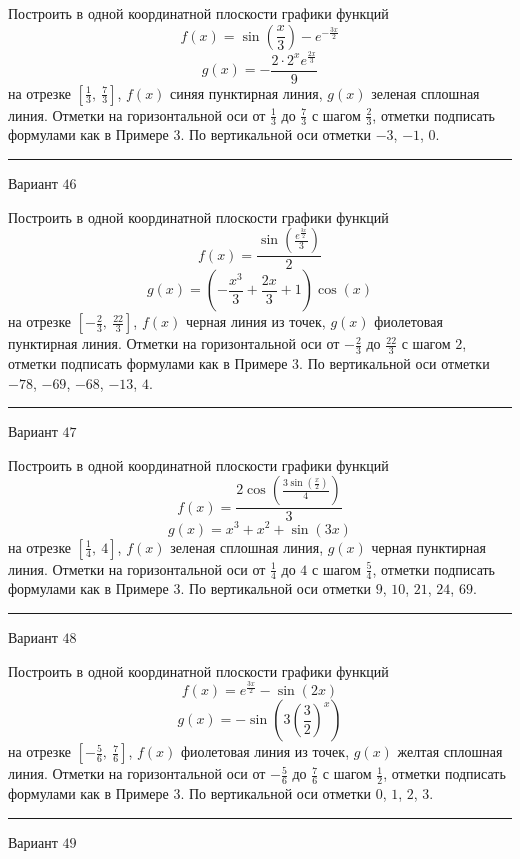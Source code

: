 \documentclass[11pt]{report}
\begin{document}
Построить в одной координатной плоскости графики функций $$f(x) = \sin{\left(\frac{x}{3} \right)} - e^{- \frac{3 x}{2}}$$ $$g(x) = - \frac{2 \cdot 2^{x} e^{\frac{2 x}{3}}}{9}$$ на отрезке $\left[\frac{1}{3}, \  \frac{7}{3}\right]$, $f(x)$ синяя пунктирная линия, $g(x)$ зеленая сплошная линия. Отметки на горизонтальной оси от $\frac{1}{3}$ до $\frac{7}{3}$ с шагом $\frac{2}{3}$, отметки подписать формулами как в Примере 3. По вертикальной оси отметки $-3$, $-1$, $0$.
\begin{center}
\noindent\rule{8cm}{0.4pt}
\end{center}
Вариант $46$


Построить в одной координатной плоскости графики функций $$f(x) = \frac{\sin{\left(\frac{e^{\frac{3 x}{2}}}{3} \right)}}{2}$$ $$g(x) = \left(- \frac{x^{3}}{3} + \frac{2 x}{3} + 1\right) \cos{\left(x \right)}$$ на отрезке $\left[- \frac{2}{3}, \  \frac{22}{3}\right]$, $f(x)$ черная линия из точек, $g(x)$ фиолетовая пунктирная линия. Отметки на горизонтальной оси от $- \frac{2}{3}$ до $\frac{22}{3}$ с шагом $2$, отметки подписать формулами как в Примере 3. По вертикальной оси отметки $-78$, $-69$, $-68$, $-13$, $4$.
\begin{center}
\noindent\rule{8cm}{0.4pt}
\end{center}
Вариант $47$


Построить в одной координатной плоскости графики функций $$f(x) = \frac{2 \cos{\left(\frac{3 \sin{\left(\frac{x}{2} \right)}}{4} \right)}}{3}$$ $$g(x) = x^{3} + x^{2} + \sin{\left(3 x \right)}$$ на отрезке $\left[\frac{1}{4}, \  4\right]$, $f(x)$ зеленая сплошная линия, $g(x)$ черная пунктирная линия. Отметки на горизонтальной оси от $\frac{1}{4}$ до $4$ с шагом $\frac{5}{4}$, отметки подписать формулами как в Примере 3. По вертикальной оси отметки $9$, $10$, $21$, $24$, $69$.
\begin{center}
\noindent\rule{8cm}{0.4pt}
\end{center}
Вариант $48$


Построить в одной координатной плоскости графики функций $$f(x) = e^{\frac{3 x}{2}} - \sin{\left(2 x \right)}$$ $$g(x) = - \sin{\left(3 \left(\frac{3}{2}\right)^{x} \right)}$$ на отрезке $\left[- \frac{5}{6}, \  \frac{7}{6}\right]$, $f(x)$ фиолетовая линия из точек, $g(x)$ желтая сплошная линия. Отметки на горизонтальной оси от $- \frac{5}{6}$ до $\frac{7}{6}$ с шагом $\frac{1}{2}$, отметки подписать формулами как в Примере 3. По вертикальной оси отметки $0$, $1$, $2$, $3$.
\begin{center}
\noindent\rule{8cm}{0.4pt}
\end{center}
Вариант $49$
\end{document}
